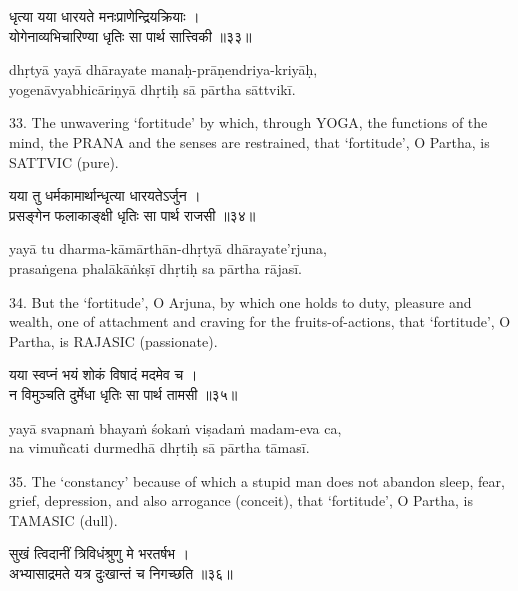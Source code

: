 \begin{gitaverse}
धृत्या यया धारयते मनःप्राणेन्द्रियक्रियाः । \\
योगेनाव्यभिचारिण्या धृतिः सा पार्थ सात्त्विकी ॥३३॥
\end{gitaverse}

\begin{transliteration}
dhṛtyā yayā dhārayate manaḥ-prāṇendriya-kriyāḥ, \\
yogenāvyabhicāriṇyā dhṛtiḥ sā pārtha sāttvikī.
\end{transliteration}

33. The unwavering `fortitude' by which, through YOGA, the functions of the
mind, the PRANA and the senses are restrained, that `fortitude', O Partha, is
SATTVIC (pure).

\begin{gitaverse}
यया तु धर्मकामार्थान्धृत्या धारयतेऽर्जुन । \\
प्रसङ्गेन फलाकाङ्क्षी धृतिः सा पार्थ राजसी ॥३४॥
\end{gitaverse}

\begin{transliteration}
yayā tu dharma-kāmārthān-dhṛtyā dhārayate'rjuna, \\
prasaṅgena phalākāṅkṣī dhṛtiḥ sa pārtha rājasī.
\end{transliteration}

34. But the `fortitude', O Arjuna, by which one holds to duty, pleasure and
wealth, one of attachment and craving for the fruits-of-actions, that
`fortitude', O Partha, is RAJASIC (passionate).

\begin{gitaverse}
यया स्वप्नं भयं शोकं विषादं मदमेव च । \\
न विमुञ्चति दुर्मेधा धृतिः सा पार्थ तामसी ॥३५॥
\end{gitaverse}

\begin{transliteration}
yayā svapnaṁ bhayaṁ śokaṁ viṣadaṁ madam-eva ca, \\
na vimuñcati durmedhā dhṛtiḥ sā pārtha tāmasī.
\end{transliteration}

35. The `constancy' because of which a stupid man does not abandon sleep, fear,
grief, depression, and also arrogance (conceit), that `fortitude', O Partha, is
TAMASIC (dull).

\begin{gitaverse}
सुखं त्विदानीं त्रिविधंश्रुणु मे भरतर्षभ । \\
अभ्यासाद्रमते यत्र दुःखान्तं च निगच्छति ॥३६॥
\end{gitaverse}

